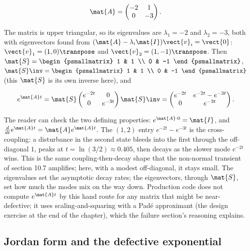 \[
\mat{A} = \begin{pmatrix} -2 & 1 \\ 0 & -3 \end{pmatrix}.
\]

The matrix is upper triangular, so its eigenvalues are $\lambda_{1} =
-2$ and $\lambda_{2} = -3$, both with eigenvectors found from
$(\mat{A} - \lambda_{i}\mat{I})\vect{v}_{i} = \vect{0}$:
$\vect{v}_{1} = (1, 0)\transpose$ and $\vect{v}_{2} = (1, -1)
\transpose$. Then $\mat{S} = \begin{psmallmatrix} 1 & 1 \\ 0 & -1
\end{psmallmatrix}$, $\mat{S}\inv = \begin{psmallmatrix} 1 & 1 \\ 0 & -1
\end{psmallmatrix}$ (this $\mat{S}$ is its own inverse here), and

\[
e^{\mat{A}t} = \mat{S}\begin{pmatrix} e^{-2t} & 0 \\ 0 & e^{-3t}
\end{pmatrix}\mat{S}\inv = \begin{pmatrix} e^{-2t} & e^{-2t} - e^{-3t}
\\ 0 & e^{-3t} \end{pmatrix}.
\]

The reader can check the two defining properties: $e^{\mat{A}\cdot 0} =
\mat{I}$, and $\frac{d}{dt}e^{\mat{A}t} = \mat{A}e^{\mat{A}t}$. The
$(1,2)$ entry $e^{-2t} - e^{-3t}$ is the cross-coupling: a disturbance
in the second state bleeds into the first through the off-diagonal $1$,
peaks at $t = \ln(3/2) \approx 0.405$, then decays as the slower mode
$e^{-2t}$ wins. This is the same coupling-then-decay shape that the
non-normal transient of section 10.7 amplifies; here, with a modest
off-diagonal, it stays small. The eigenvalues set the asymptotic decay
rates; the eigenvectors, through $\mat{S}$, set how much the modes mix
on the way down. Production code does not compute $e^{\mat{A}t}$ by this
hand route for any matrix that might be near-defective; it uses
scaling-and-squaring with a Pad\'e approximant (the design exercise at
the end of the chapter), which the failure section's reasoning explains.

\subsection{Jordan form and the defective exponential}

